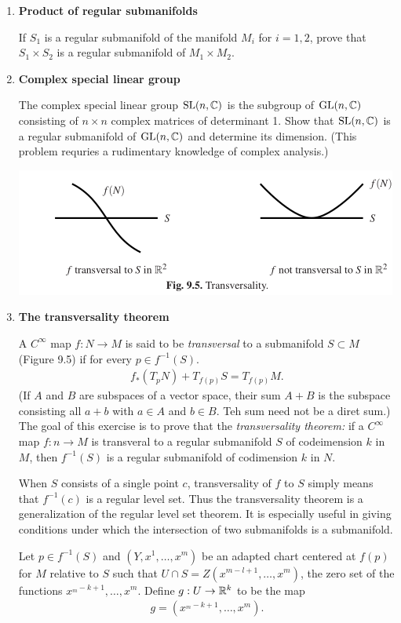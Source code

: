 \documentclass[12pt,a4paper]{report}
\begin{document}
\begin{enumerate}[label=9.\arabic*.]
\item \textbf{Product of regular submanifolds}

If $S_1$ is a regular submanifold of the manifold $M_i$ for $i=1,2$, prove that $S_1 \times S_2$ is a regular submanifold of $M_1 \times M_2$.

\item \textbf{Complex special linear group}
\newcommand{\SL}{\operatorname{SL}}
\newcommand{\GL}{\operatorname{GL}}

The complex special linear group $\SL(n,\C)$ is the subgroup of $\GL(n,\C)$ consisting of $n\times n$ complex matrices of determinant 1.  Show that $\SL(n, \C)$ is a regular submanifold of $\GL(n,\C)$ and determine its dimension. (This problem requries a rudimentary knowledge of complex analysis.)

\includegraphics[scale=1]{Tu_9.5.png} 
\item \textbf{The transversality theorem}

A $C^\infty$ map $f: N \to M$ is said to be \textit{transversal} to a submanifold $S \subset M$ (Figure 9.5) if for every $p\in f^{-1}(S)$.
\begin{align*}
	f_*(T_pN)+T_{f(p)}S=T_{f(p)}M.
\end{align*}(If $A$ and $B$ are subspaces of a vector space, their sum $A+B$ is the subspace consisting all $a+b$ with $a \in A$ and $b \in B$.  Teh sum need not be a diret sum.)  The goal of this exercise is to prove that the \textit{transversality theorem:} if a $C^\infty$ map $f:n \to M$ is transveral to a regular submanifold $S$ of codeimension $k$ in $M$, then $f^{-1}(S)$ is a regular submanifold of codimension $k$ in $N$.

When $S$ consists of a single point $c$, transversality of $f$ to $S$ simply means that $f^{-1}(c)$ is a regular level set.  Thus the transversality theorem is a generalization of the regular level set theorem.  It is especially useful in giving conditions under which the intersection of two submanifolds is a submanifold.

Let $p \in f^{-1}(S)$ and $(Y,x^1,\dots,x^m)$ be an adapted chart centered at $f(p)$ for $M$ relative to $S$ such that $U\cap S=Z(x^{m-l+1}, \dots, x^m)$, the zero set of the functions $x^{_m-k+1},\dots,x^m$.  Define $g:U \to \mathbb{R}^k$ to be the map
\begin{align*}
	g = (x^{_m-k+1},\dots,x^m).
\end{align*}


\end{enumerate}
\end{document}
